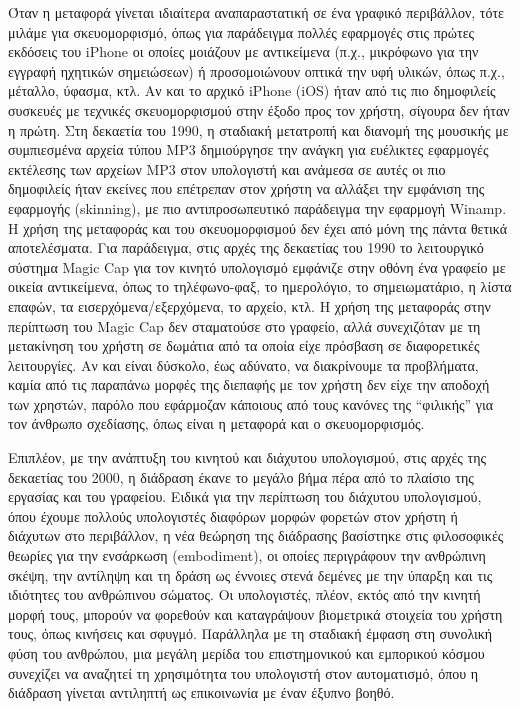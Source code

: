 \documentclass[
]{article}
\begin{document}
Όταν η μεταφορά γίνεται ιδιαίτερα αναπαραστατική σε ένα γραφικό
περιβάλλον, τότε μιλάμε για σκευομορφισμό, όπως για παράδειγμα πολλές
εφαρμογές στις πρώτες εκδόσεις του iPhone οι οποίες μοιάζουν με
αντικείμενα (π.χ., μικρόφωνο για την εγγραφή ηχητικών σημειώσεων) ή
προσομοιώνουν οπτικά την υφή υλικών, όπως π.χ., μέταλλο, ύφασμα, κτλ. Αν
και το αρχικό iPhone (iOS) ήταν από τις πιο δημοφιλείς συσκευές με
τεχνικές σκευομορφισμού στην έξοδο προς τον χρήστη, σίγουρα δεν ήταν η
πρώτη. Στη δεκαετία του 1990, η σταδιακή μετατροπή και διανομή της
μουσικής με συμπιεσμένα αρχεία τύπου MP3 δημιούργησε την ανάγκη για
ευέλικτες εφαρμογές εκτέλεσης των αρχείων MP3 στον υπολογιστή και
ανάμεσα σε αυτές οι πιο δημοφιλείς ήταν εκείνες που επέτρεπαν στον
χρήστη να αλλάξει την εμφάνιση της εφαρμογής (skinning), με πιο
αντιπροσωπευτικό παράδειγμα την εφαρμογή Winamp. Η χρήση της μεταφοράς
και του σκευομορφισμού δεν έχει από μόνη της πάντα θετικά αποτελέσματα.
Για παράδειγμα, στις αρχές της δεκαετίας του 1990 το λειτουργικό σύστημα
Magic Cap για τον κινητό υπολογισμό εμφάνιζε στην οθόνη ένα γραφείο με
οικεία αντικείμενα, όπως το τηλέφωνο-φαξ, το ημερολόγιο, το
σημειωματάριο, η λίστα επαφών, τα εισερχόμενα/εξερχόμενα, το αρχείο,
κτλ. Η χρήση της μεταφοράς στην περίπτωση του Magic Cap δεν σταματούσε
στο γραφείο, αλλά συνεχιζόταν με τη μετακίνηση του χρήστη σε δωμάτια από
τα οποία είχε πρόσβαση σε διαφορετικές λειτουργίες. Αν και είναι
δύσκολο, έως αδύνατο, να διακρίνουμε τα προβλήματα, καμία από τις
παραπάνω μορφές της διεπαφής με τον χρήστη δεν είχε την αποδοχή των
χρηστών, παρόλο που εφάρμοζαν κάποιους από τους κανόνες της ``φιλικής''
για τον άνθρωπο σχεδίασης, όπως είναι η μεταφορά και ο σκευομορφισμός.

Επιπλέον, με την ανάπτυξη του κινητού και διάχυτου υπολογισμού, στις
αρχές της δεκαετίας του 2000, η διάδραση έκανε το μεγάλο βήμα πέρα από
το πλαίσιο της εργασίας και του γραφείου. Ειδικά για την περίπτωση του
διάχυτου υπολογισμού, όπου έχουμε πολλούς υπολογιστές διαφόρων μορφών
φορετών στον χρήστη ή διάχυτων στο περιβάλλον, η νέα θεώρηση της
διάδρασης βασίστηκε στις φιλοσοφικές θεωρίες για την ενσάρκωση
(embodiment), οι οποίες περιγράφουν την ανθρώπινη σκέψη, την αντίληψη
και τη δράση ως έννοιες στενά δεμένες με την ύπαρξη και τις ιδιότητες
του ανθρώπινου σώματος. Οι υπολογιστές, πλέον, εκτός από την κινητή
μορφή τους, μπορούν να φορεθούν και καταγράψουν βιομετρικά στοιχεία του
χρήστη τους, όπως κινήσεις και σφυγμό. Παράλληλα με τη σταδιακή έμφαση
στη συνολική φύση του ανθρώπου, μια μεγάλη μερίδα του επιστημονικού και
εμπορικού κόσμου συνεχίζει να αναζητεί τη χρησιμότητα του υπολογιστή
στον αυτοματισμό, όπου η διάδραση γίνεται αντιληπτή ως επικοινωνία με
έναν έξυπνο βοηθό.
\end{document}
